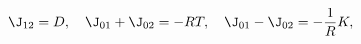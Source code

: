 \begin{equation}
\J_{12}=D,\quad
\J_{01}+\J_{02}=-RT,\quad
\J_{01}-\J_{02}=-\frac{1}{R}K,
\label{direct}
\end{equation}

